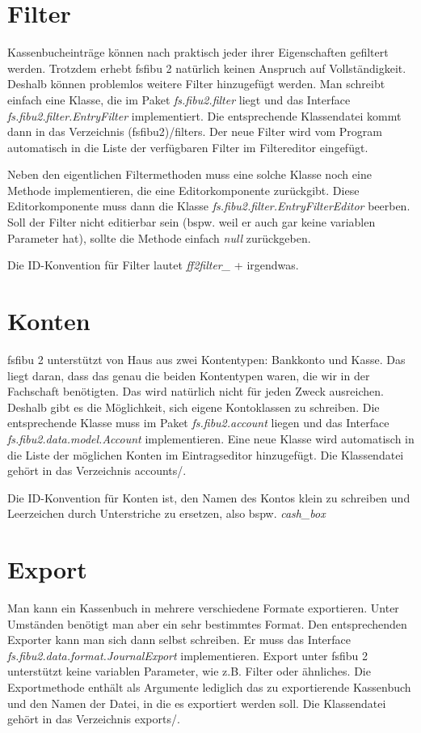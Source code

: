 \documentclass[a4paper,10pt,halfparskip,oneside,smallheadings]{scrbook}
\begin{document}
\section{Filter}
Kassenbucheinträge können nach praktisch jeder ihrer Eigenschaften gefiltert werden. Trotzdem erhebt fsfibu 2 natürlich keinen Anspruch auf Vollständigkeit. Deshalb können problemlos weitere Filter hinzugefügt werden. Man schreibt einfach eine Klasse, die im Paket \textit{fs.fibu2.filter} liegt und das Interface \textit{fs.fibu2.filter.EntryFilter} implementiert. Die entsprechende Klassendatei kommt dann in das Verzeichnis (fsfibu2)/filters. Der neue Filter wird vom Program automatisch in die Liste der verfügbaren Filter im Filtereditor eingefügt. 

Neben den eigentlichen Filtermethoden muss eine solche Klasse noch eine Methode implementieren, die eine Editorkomponente zurückgibt. Diese Editorkomponente muss dann die Klasse \textit{fs.fibu2.filter.EntryFilterEditor} beerben. Soll der Filter nicht editierbar sein (bspw. weil er auch gar keine variablen Parameter hat), sollte die Methode einfach \textit{null} zurückgeben.

Die ID-Konvention für Filter lautet \textit{ff2filter\_} + irgendwas.

\section{Konten}
fsfibu 2 unterstützt von Haus aus zwei Kontentypen: Bankkonto und Kasse. Das liegt daran, dass das genau die beiden Kontentypen waren, die wir in der Fachschaft benötigten. Das wird natürlich nicht für jeden Zweck ausreichen. Deshalb gibt es die Möglichkeit, sich eigene Kontoklassen zu schreiben. Die entsprechende Klasse muss im Paket \textit{fs.fibu2.account} liegen und das Interface \textit{fs.fibu2.data.model.Account} implementieren. Eine neue Klasse wird automatisch in die Liste der möglichen Konten im Eintragseditor hinzugefügt. Die Klassendatei gehört in das Verzeichnis accounts/.

Die ID-Konvention für Konten ist, den Namen des Kontos klein zu schreiben und Leerzeichen durch Unterstriche zu ersetzen, also bspw. \textit{cash\_box}

\section{Export}
Man kann ein Kassenbuch in mehrere verschiedene Formate exportieren. Unter Umständen benötigt man aber ein sehr bestimmtes Format. Den entsprechenden Exporter kann man sich dann selbst schreiben. Er muss das Interface \textit{fs.fibu2.data.format.JournalExport} implementieren. Export unter fsfibu 2 unterstützt keine variablen Parameter, wie z.B. Filter oder ähnliches. Die Exportmethode enthält als Argumente lediglich das zu exportierende Kassenbuch und den Namen der Datei, in die es exportiert werden soll. Die Klassendatei gehört in das Verzeichnis exports/.
\end{document}
